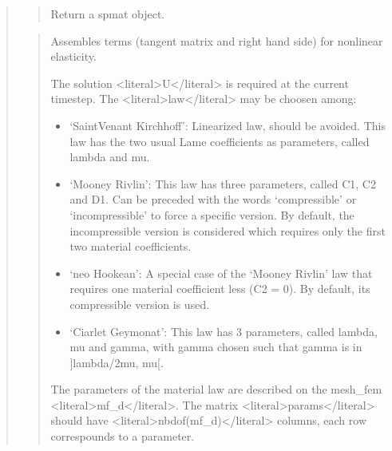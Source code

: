 \documentclass[a4paper,11pt,english]{sphinxmanual}
\begin{document}
\begin{quote}
\begin{quote}
\sphinxAtStartPar
Return a spmat object.
\end{quote}

\sphinxAtStartPar
{}
\begin{quote}

\sphinxAtStartPar
Assembles terms (tangent matrix and right hand side) for nonlinear elasticity.

\sphinxAtStartPar
The solution \textless{}literal\textgreater{}U\textless{}/literal\textgreater{} is required at the current time\sphinxhyphen{}step. The \textless{}literal\textgreater{}law\textless{}/literal\textgreater{}
may be choosen among:
\begin{itemize}
\item {} 
\sphinxAtStartPar
‘SaintVenant Kirchhoff’:
Linearized law, should be avoided. This law has the two usual
Lame coefficients as parameters, called lambda and mu.

\item {} 
\sphinxAtStartPar
‘Mooney Rivlin’:
This law has three parameters, called C1, C2 and D1.
Can be preceded with the words ‘compressible’ or ‘incompressible’ to force
a specific version. By default, the incompressible version is considered
which requires only the first two material coefficients.

\item {} 
\sphinxAtStartPar
‘neo Hookean’:
A special case of the ‘Mooney Rivlin’ law that requires one material
coefficient less (C2 = 0). By default, its compressible version is used.

\item {} 
\sphinxAtStartPar
‘Ciarlet Geymonat’:
This law has 3 parameters, called lambda, mu and gamma, with
gamma chosen such that gamma is in {]}\sphinxhyphen{}lambda/2\sphinxhyphen{}mu, \sphinxhyphen{}mu{[}.

\end{itemize}

\sphinxAtStartPar
The parameters of the material law are described on the mesh\_fem \textless{}literal\textgreater{}mf\_d\textless{}/literal\textgreater{}.
The matrix \textless{}literal\textgreater{}params\textless{}/literal\textgreater{} should have \textless{}literal\textgreater{}nbdof(mf\_d)\textless{}/literal\textgreater{} columns, each row
correspounds to a parameter.


\end{quote}
\end{quote}
\end{document}

